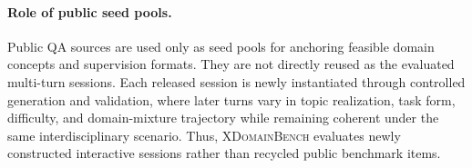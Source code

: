\paragraph{Role of public seed pools.}
Public QA sources are used only as seed pools for anchoring feasible domain concepts and supervision formats.
They are not directly reused as the evaluated multi-turn sessions.
Each released session is newly instantiated through controlled generation and validation, where later turns vary in topic realization, task form, difficulty, and domain-mixture trajectory while remaining coherent under the same interdisciplinary scenario.
Thus, \textsc{XDomainBench} evaluates newly constructed interactive sessions rather than recycled public benchmark items.
\vspace{-0.5mm}

